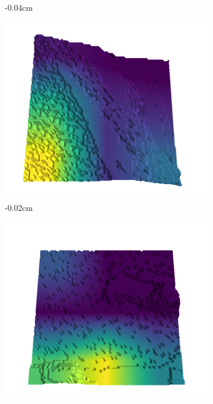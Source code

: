 \documentclass[../document.tex]{subfiles}
\begin{document}
\begin{figure}[H]
\begin{subfigure}[b]{0.242\linewidth}
        \caption{-0.04cm}
        \end{subfigure}
        \begin{subfigure}[b]{0.242\linewidth}
        \includegraphics[width=\linewidth]{../img/5/quarry/false_negative/11-patch-3d-majavi-colormap-70.png}
        \caption{-0.02cm}
        \end{subfigure}
        \begin{subfigure}[b]{0.242\linewidth}
        \includegraphics[width=\linewidth]{../img/5/quarry/false_negative/12-patch-3d-majavi-colormap-75.png}

\end{subfigure}
\end{figure}
\end{document}
